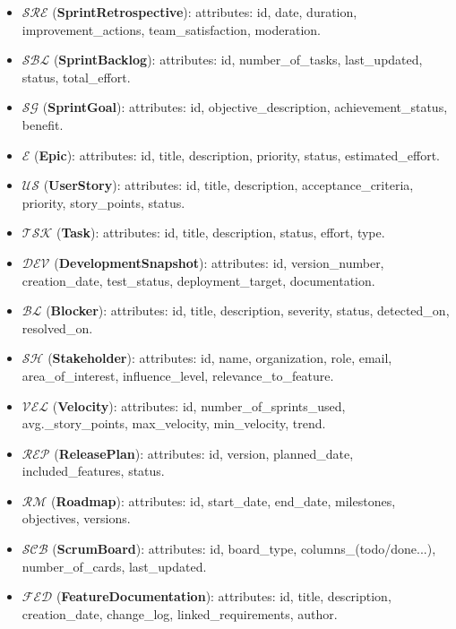 \documentclass[11pt,a4paper]{article}
\begin{document}
\begin{itemize}
  \item $\mathcal{SRE}$ (\textbf{SprintRetrospective}): attributes: id, date, duration, improvement\_actions, team\_satisfaction, moderation.
  \item $\mathcal{SBL}$ (\textbf{SprintBacklog}): attributes: id, number\_of\_tasks, last\_updated, status, total\_effort.
  \item $\mathcal{SG}$ (\textbf{SprintGoal}): attributes: id, objective\_description, achievement\_status, benefit.
  \item $\mathcal{E}$ (\textbf{Epic}): attributes: id, title, description, priority, status, estimated\_effort.
  \item $\mathcal{US}$ (\textbf{UserStory}): attributes: id, title, description, acceptance\_criteria, priority, story\_points, status.
  \item $\mathcal{TSK}$ (\textbf{Task}): attributes: id, title, description, status, effort, type.
  \item $\mathcal{DEV}$ (\textbf{DevelopmentSnapshot}): attributes: id, version\_number, creation\_date, test\_status, deployment\_target, documentation.
  \item $\mathcal{BL}$ (\textbf{Blocker}): attributes: id, title, description, severity, status, detected\_on, resolved\_on.
  \item $\mathcal{SH}$ (\textbf{Stakeholder}): attributes: id, name, organization, role, email, area\_of\_interest, influence\_level, relevance\_to\_feature.
  \item $\mathcal{VEL}$ (\textbf{Velocity}): attributes: id, number\_of\_sprints\_used, avg.\_story\_points, max\_velocity, min\_velocity, trend.
  \item $\mathcal{REP}$ (\textbf{ReleasePlan}): attributes: id, version, planned\_date, included\_features, status.
  \item $\mathcal{RM}$ (\textbf{Roadmap}): attributes: id, start\_date, end\_date, milestones, objectives, versions.
  \item $\mathcal{SCB}$ (\textbf{ScrumBoard}): attributes: id, board\_type, columns\_(todo/done...), number\_of\_cards, last\_updated.
  \item $\mathcal{FED}$ (\textbf{FeatureDocumentation}): attributes: id, title, description, creation\_date, change\_log, linked\_requirements, author.
\end{itemize}
\end{document}
